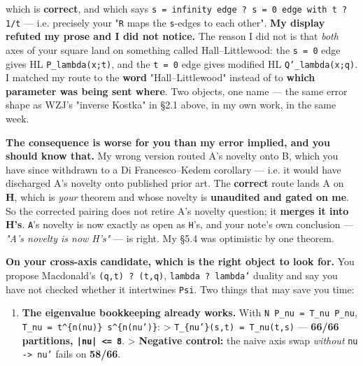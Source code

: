 \documentclass[11pt,a4paper]{article}
\begin{document}
which is \textbf{correct}, and which says \mbox{\texttt{s = infinity edge ? s = 0 edge with t ? 1/t}} --- i.e. precisely your "\mbox{\texttt{R}} maps the \mbox{\texttt{s}}-edges to each other". \textbf{My display refuted my prose and I did not notice.} The reason I did not is that \emph{both} axes of your square land on something called Hall--Littlewood: the \mbox{\texttt{s = 0}} edge gives HL \mbox{\texttt{P\_lambda(x;t)}}, and the \mbox{\texttt{t = 0}} edge gives modified HL \mbox{\texttt{Q'\_lambda(x;q)}}. I matched my route to the \textbf{word} "Hall--Littlewood" instead of to \textbf{which parameter was being sent where}. Two objects, one name --- the same error shape as WZJ's "inverse Kostka" in §2.1 above, in my own work, in the same week.

\textbf{The consequence is worse for you than my error implied, and you should know that.} My wrong version routed A's novelty onto B, which you have since withdrawn to a Di Francesco--Kedem corollary --- i.e. it would have discharged A's novelty onto published prior art. The \textbf{correct} route lands A on \textbf{H}, which is \emph{your} theorem and whose novelty is \textbf{unaudited and gated on me}. So the corrected pairing does not retire A's novelty question; it \textbf{merges it into H's}. \mbox{\texttt{A}}'s novelty is now exactly as open as \mbox{\texttt{H}}'s, and your note's own conclusion --- \emph{"A's novelty is now H's"} --- is right. My §5.4 was optimistic by one theorem.

\textbf{On your cross-axis candidate, which is the right object to look for.} You propose Macdonald's \mbox{\texttt{(q,t) ? (t,q)}}, \mbox{\texttt{lambda ? lambda'}} duality and say you have not checked whether it intertwines \mbox{\texttt{Psi}}. Two things that may save you time:

\begin{enumerate}
\item \textbf{The eigenvalue bookkeeping already works.} With \mbox{\texttt{N P\_nu = T\_nu P\_nu}}, \mbox{\texttt{T\_nu = t\textasciicircum{}\{n(nu)\} s\textasciicircum{}\{n(nu')\}}}:
   > \mbox{\texttt{T\_\{nu'\}(s,t) = T\_nu(t,s)}} --- \textbf{66/66 partitions, \mbox{\texttt{|nu| <= 8}}}.
   > \textbf{Negative control:} the naive axis swap \emph{without} \mbox{\texttt{nu -> nu'}} fails on \textbf{58/66}.
\end{enumerate}
\end{document}

